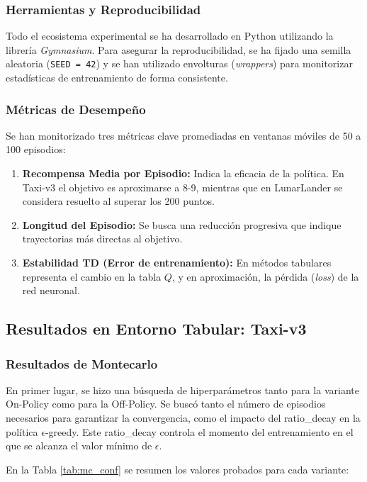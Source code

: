 \subsubsection{Herramientas y Reproducibilidad}
Todo el ecosistema experimental se ha desarrollado en Python utilizando la librería \textit{Gymnasium}. Para asegurar la reproducibilidad, se ha fijado una semilla aleatoria (\texttt{SEED = 42}) y se han utilizado envolturas (\textit{wrappers}) para monitorizar estadísticas de entrenamiento de forma consistente.

\subsubsection{Métricas de Desempeño}
Se han monitorizado tres métricas clave promediadas en ventanas móviles de 50 a 100 episodios:
\begin{enumerate}
\item \textbf{Recompensa Media por Episodio:} Indica la eficacia de la política. En Taxi-v3 el objetivo es aproximarse a 8-9, mientras que en LunarLander se considera resuelto al superar los 200 puntos.
\item \textbf{Longitud del Episodio:} Se busca una reducción progresiva que indique trayectorias más directas al objetivo.
\item \textbf{Estabilidad TD (Error de entrenamiento):} En métodos tabulares representa el cambio en la tabla $Q$, y en aproximación, la pérdida (\textit{loss}) de la red neuronal.
\end{enumerate}

\subsection{Resultados en Entorno Tabular: Taxi-v3}

\subsubsection{Resultados de Montecarlo}
En primer lugar, se hizo una búsqueda de hiperparámetros tanto para la variante On-Policy como para la Off-Policy. 
Se buscó tanto el número de episodios necesarios para garantizar la convergencia, como el impacto
del ratio\_decay en la política $\epsilon$-greedy. Este ratio\_decay controla el momento del
entrenamiento en el que se alcanza el valor mínimo de $\epsilon$.

En la Tabla \ref{tab:mc_conf} se resumen los valores probados para cada variante:

